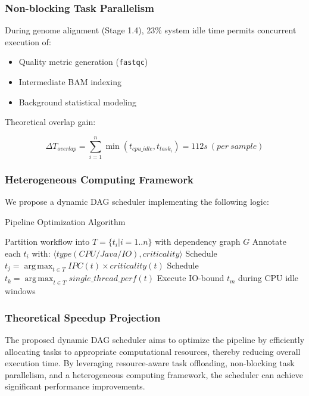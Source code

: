 \documentclass[a4paper,12pt]{article}
\DeclareMathOperator*{\argmax}{arg\,max}  %
\begin{document}
\subsubsection{Non-blocking Task Parallelism}
During genome alignment (Stage 1.4), 23\% system idle time permits concurrent execution of:
\begin{itemize}
    \item Quality metric generation (\texttt{fastqc})
    \item Intermediate BAM indexing
    \item Background statistical modeling
\end{itemize}

Theoretical overlap gain:

\begin{equation}
\Delta T_{overlap} = \sum_{i=1}^n \min(t_{cpu\_idle}, t_{task_i}) = 112s\ (per\ sample)
\end{equation}

\newpage

\subsubsection{Heterogeneous Computing Framework}
We propose a dynamic DAG scheduler implementing the following logic:

\begin{algorithm}[H]
\caption{Pipeline Optimization Algorithm}
\begin{algorithmic}[1]
\State Partition workflow into \(T = \{t_i|i=1..n\}\) with dependency graph \(G\)
\State Annotate each \(t_i\) with: \(\langle \mathit{type}(CPU/Java/IO), \mathit{criticality} \rangle\)
        \State Schedule \(t_j = \argmax_{t \in T} \mathit{IPC}(t) \times \mathit{criticality}(t)\)
        \State Schedule \(t_k = \argmax_{t \in T} \mathit{single\_thread\_perf}(t)\)
    \EndIf
    \State Execute IO-bound \(t_m\) during CPU idle windows
\EndWhile
\end{algorithmic}
\end{algorithm}

\subsubsection{Theoretical Speedup Projection}
The proposed dynamic DAG scheduler aims to optimize the pipeline by efficiently allocating tasks to appropriate computational resources, thereby reducing overall execution time. By leveraging resource-aware task offloading, non-blocking task parallelism, and a heterogeneous computing framework, the scheduler can achieve significant performance improvements.
\end{document}
